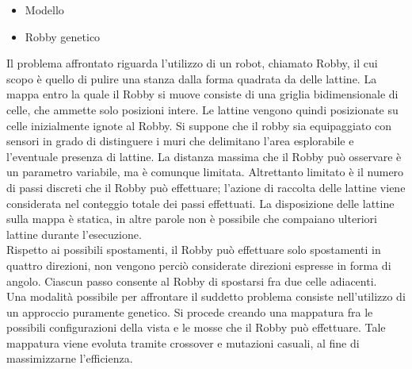 \begin{itemize}
 \item Modello
 \item Robby genetico
\end{itemize}
Il problema affrontato riguarda l'utilizzo di un robot, chiamato Robby, il cui 
scopo è quello di pulire una stanza dalla forma quadrata da delle lattine.
La mappa entro la quale il Robby si muove consiste di una griglia 
bidimensionale di celle, che ammette solo posizioni intere.
Le lattine vengono quindi posizionate su celle inizialmente ignote al Robby. Si 
suppone che il robby sia equipaggiato con sensori in grado di distinguere i muri 
che delimitano l'area esplorabile e l'eventuale presenza di lattine. La distanza 
massima che il Robby può osservare è un parametro variabile, ma è comunque 
limitata. Altrettanto limitato è il numero di passi discreti che il Robby può 
effettuare; l'azione di raccolta delle lattine viene considerata nel conteggio 
totale dei passi effettuati. La disposizione delle lattine sulla mappa è 
statica, in altre parole non è possibile che compaiano
ulteriori lattine durante l'esecuzione.
\\
Rispetto ai possibili spostamenti, il Robby può effettuare solo spostamenti 
in quattro direzioni, non vengono perciò considerate direzioni espresse in 
forma di angolo. Ciascun passo consente al Robby di spostarsi fra due celle 
adiacenti.
\\
Una modalità possibile per affrontare il suddetto problema consiste 
nell'utilizzo di un approccio puramente genetico. Si procede creando una 
mappatura fra le possibili configurazioni della vista e le mosse che il Robby 
può effettuare. Tale mappatura viene evoluta tramite crossover e mutazioni 
casuali, al fine di massimizzarne l'efficienza.